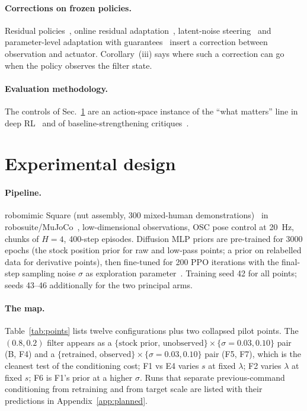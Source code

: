 \documentclass{article}
\begin{document}
\paragraph{Corrections on frozen policies.} Residual policies~\citep{silver2018residual,johannink2019residual}, online residual adaptation~\citep{muttaqien2026orpaonlineresidualpolicy}, latent-noise steering~\citep{wagenmaker2025steeringdiffusionpolicylatent} and parameter-level adaptation with guarantees~\citep{oconnell2024neuralflyenablesrapidlearning,kumar2021rmarapidmotoradaptation} insert a correction between observation and actuator. Corollary~(iii) says where such a correction can go when the policy observes the filter state.

\paragraph{Evaluation methodology.} The controls of Sec.~\ref{sec:design} are an action-space instance of the ``what matters'' line in deep RL~\citep{henderson2018deeprlmatters,engstrom2020implementationmatters,andrychowicz2021whatmatters,agarwal2021precipice} and of baseline-strengthening critiques~\citep{press2024rdumbsimpleapproachquestions,dauner2023partingmisconceptionslearningbasedvehicle}.

\section{Experimental design}
\label{sec:design}

\paragraph{Pipeline.} robomimic Square (nut assembly, 300 mixed-human demonstrations)~\citep{mandlekar2021robomimic} in robosuite/MuJoCo~\citep{zhu2020robosuite}, low-dimensional observations, OSC pose control at \SI{20}{Hz}, chunks of $H=4$, 400-step episodes. Diffusion MLP priors are pre-trained for 3000 epochs (the stock position prior for raw and low-pass points; a prior on relabelled data for derivative points), then fine-tuned for 200 PPO iterations with the final-step sampling noise $\sigma$ as exploration parameter~\citep{ren2024diffusionpolicypolicyoptimization}. Training seed 42 for all points; seeds 43--46 additionally for the two principal arms.

\paragraph{The map.} Table~\ref{tab:points} lists twelve configurations plus two collapsed pilot points. The $(0.8,0.2)$ filter appears as a $\{\text{stock prior, unobserved}\}\times\{\sigma=0.03,0.10\}$ pair (B, F4) and a $\{\text{retrained, observed}\}\times\{\sigma=0.03,0.10\}$ pair (F5, F7), which is the cleanest test of the conditioning cost; F1 vs E4 varies $s$ at fixed $\lambda$; F2 varies $\lambda$ at fixed $s$; F6 is F1's prior at a higher $\sigma$. Runs that separate previous-command conditioning from retraining and from target scale are listed with their predictions in Appendix~\ref{app:planned}.
\end{document}
